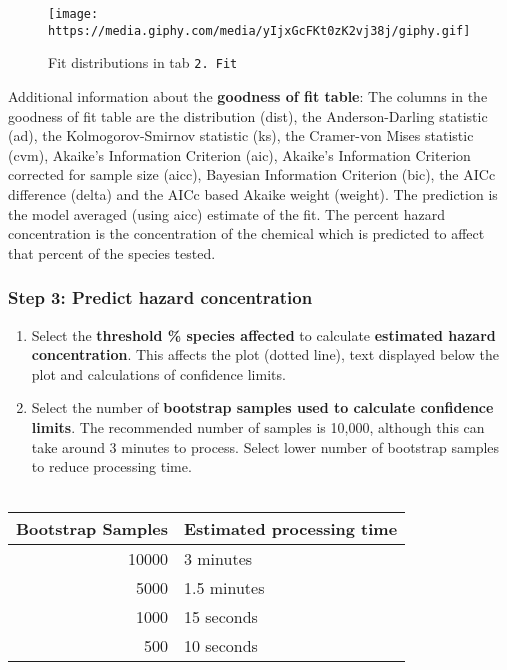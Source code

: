 \documentclass[]{article}
\providecommand{\tightlist}{%
  \setlength{\itemsep}{0pt}\setlength{\parskip}{0pt}}
\begin{document}
\begin{figure}
\centering
\texttt{[image: https://media.giphy.com/media/yIjxGcFKt0zK2vj38j/giphy.gif]}
\caption{Fit distributions in tab \texttt{2.\ Fit}}
\end{figure}

Additional information about the \textbf{goodness of fit table}: The
columns in the goodness of fit table are the distribution (dist), the
Anderson-Darling statistic (ad), the Kolmogorov-Smirnov statistic (ks),
the Cramer-von Mises statistic (cvm), Akaike's Information Criterion
(aic), Akaike's Information Criterion corrected for sample size (aicc),
Bayesian Information Criterion (bic), the AICc difference (delta) and
the AICc based Akaike weight (weight). The prediction is the model
averaged (using aicc) estimate of the fit. The percent hazard
concentration is the concentration of the chemical which is predicted to
affect that percent of the species tested.\\

\hypertarget{step-3-predict-hazard-concentration}{%
\subsubsection{Step 3: Predict hazard
concentration}\label{step-3-predict-hazard-concentration}}

\begin{enumerate}
\def\labelenumi{\arabic{enumi}.}
\tightlist
\item
  Select the \textbf{threshold \% species affected} to calculate
  \textbf{estimated hazard concentration}. This affects the plot (dotted
  line), text displayed below the plot and calculations of confidence
  limits.
\item
  Select the number of \textbf{bootstrap samples used to calculate
  confidence limits}. The recommended number of samples is 10,000,
  although this can take around 3 minutes to process. Select lower
  number of bootstrap samples to reduce processing time.\\
  ~\\
\end{enumerate}

\begin{table}[H]
\centering\begingroup\fontsize{11}{13}\selectfont

\begin{tabular}{r|l}
\hline
Bootstrap Samples & Estimated processing time\\
\hline
10000 & 3 minutes\\
\hline
5000 & 1.5 minutes\\
\hline
1000 & 15 seconds\\
\hline
500 & 10 seconds\\
\hline
\end{tabular}
\endgroup{}
\end{table}
\end{document}
